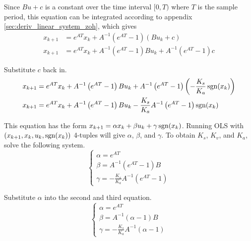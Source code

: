 Since $Bu + c$ is a constant over the time interval $[0, T)$ where $T$ is the
sample period, this equation can be integrated according to appendix
\ref{sec:deriv_linear_system_zoh}, which gives
\begin{align*}
  x_{k+1} &= e^{AT} x_k + A^{-1} (e^{AT} - 1) (Bu_k + c) \\
  x_{k+1} &= e^{AT} x_k + A^{-1} (e^{AT} - 1)Bu_k + A^{-1} (e^{AT} - 1)c
\end{align*}

Substitute $c$ back in.
\begin{align*}
  x_{k+1} &= e^{AT} x_k + A^{-1} \left(e^{AT} - 1\right) B u_k
    + A^{-1} \left(e^{AT} - 1\right) \left(-\frac{K_s}{K_a} \operatorname{sgn}(x_k)\right) \\
  x_{k+1} &= e^{AT} x_k +  A^{-1} \left(e^{AT} - 1\right) B u_k
    - \frac{K_s}{K_a} A^{-1} \left(e^{AT} - 1\right) \operatorname{sgn}(x_k)
\end{align*}

This equation has the form
$x_{k+1} = \alpha x_k + \beta u_k + \gamma \operatorname{sgn}(x_k)$. Running OLS with
$(x_{k+1}, x_k, u_k, \operatorname{sgn}(x_k))$ 4-tuples will give $\alpha$, $\beta$, and
$\gamma$. To obtain $K_s$, $K_v$, and $K_a$, solve the following system.
\begin{equation*}
  \begin{cases}
    \alpha = e^{AT} \\
    \beta = A^{-1} \left(e^{AT} - 1\right)B \\
    \gamma = -\frac{K_s}{K_a} A^{-1} \left(e^{AT} - 1\right)
  \end{cases}
\end{equation*}

Substitute $\alpha$ into the second and third equation.
\begin{equation}
  \begin{cases}
    \alpha = e^{AT} \\
    \beta = A^{-1} (\alpha - 1) B \\
    \gamma = -\frac{K_s}{K_a} A^{-1} (\alpha - 1)
  \end{cases} \label{eq:ols_system}
\end{equation}

